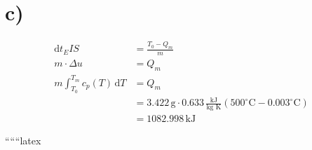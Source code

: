 

\section*{c)}

\begin{align*}
\text{d}t_EIS & = \frac{T_0 - Q_m}{m} \\
m \cdot \Delta u & = Q_m \\
m \int_{T_0}^{T_m} c_p(T) \, \text{d}T & = Q_m \\
& = 3.422 \, \text{g} \cdot 0.633 \, \frac{\text{kJ}}{\text{kg K}} (500^\circ \text{C} - 0.003^\circ \text{C}) \\
& = 1082.998 \, \text{kJ}
\end{align*}

``````latex